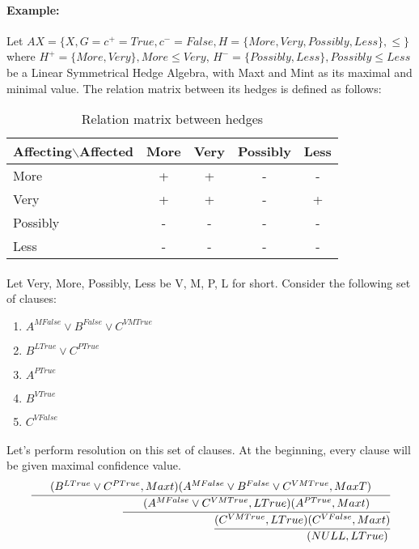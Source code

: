 \documentclass[part1.tex]{subfiles}
\begin{document}
\paragraph{Example: }
Let $AX = \{X, G = {c^{+} = True, c^{-} =
False}, H = \{More, Very, Possibly, Less\}, \le\}$ \\ where
$H^{+} =
\{More, Very\}, More \le Very$, $H^{-} = \{Possibly, Less\},
Possibly \le Less$ be a Linear Symmetrical Hedge Algebra, with
Maxt and Mint as its maximal and minimal value. The relation matrix between its hedges is
defined as follows:
\begin{table}[H]
    \centering
    \begin{tabular}{|l|c|c|c|c|}
      \hline
                  Affecting$\backslash$Affected & More & Very &
      Possibly & Less \\ \hline
                  More                        & +    & +    & -
      & -    \\ \hline
                  Very                        & +    & +    & -
      & +    \\ \hline
                  Possibly                    & -    & -    & -
      & -    \\ \hline
                  Less                        & -    & -    & -
      & -    \\ \hline
    \end{tabular}
    \caption {Relation matrix between hedges}
\end{table}
\paragraph{} Let Very, More, Possibly, Less be V, M, P, L for
short. Consider the following set of clauses:\\
\begin{enumerate}
  \item $A^{MFalse} \vee B^{False} \vee C^{VMTrue}$
  \item $B^{LTrue} \vee C^{PTrue}$
  \item $A^{PTrue}$
  \item $B^{VTrue}$
  \item $C^{VFalse}$
\end{enumerate}
\paragraph{} Let's perform resolution on this set of clauses. At
the beginning, every clause will be given maximal confidence
value.
\[
  \cfrac{ (B^{LTrue} \vee C^{PTrue},Maxt) (A^{MFalse} \vee B^{False} \vee
  C^{VMTrue}, MaxT)}
  {\qquad\qquad\qquad\qquad \cfrac{ (A^{MFalse} \vee C^{VMTrue}, LTrue) (A^{PTrue}, Maxt)}
    {\qquad\qquad\qquad\qquad \cfrac {(C^{VMTrue}, LTrue) (C^{VFalse}, Maxt)}
      {\qquad\qquad\qquad\qquad (NULL, LTrue)
        }
     }
    }
\]
\end{document}
